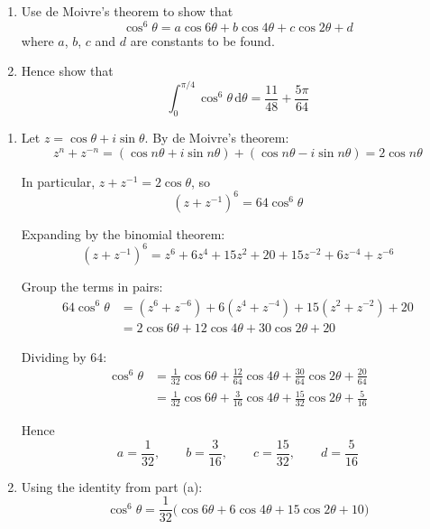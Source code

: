 \documentclass[leqno]{article}
\begin{document}
\begin{enumerate}[
  label=\textbf{\arabic*.},
  leftmargin=*,
  topsep=0pt,
  partopsep=0pt,
  parsep=0pt
]
\newpage

\questionitem

\begin{enumerate}[label=\textbf{(\alph*)}]
  \item Use de Moivre's theorem to show that
  \[
  \cos^6 \theta = a \cos 6\theta + b \cos 4\theta + c \cos 2\theta + d
  \]
  where $a$, $b$, $c$ and $d$ are constants to be found.  \\
  \item Hence show that
  \[
  \int_0^{\pi/4} \cos^6 \theta \, \mathrm{d}\theta = \frac{11}{48} + \frac{5\pi}{64}
  \]
\end{enumerate}

\vspace*{10pt}

\begin{djsSolution}
\begin{enumerate}[label=\textbf{(\alph*)}]
  \item Let \(z=\cos\theta+i\sin\theta\). By de Moivre's theorem:
  \[
  z^n+z^{-n}=(\cos n\theta+i\sin n\theta)+(\cos n\theta-i\sin n\theta)=2\cos n\theta
  \]

  In particular, \(z+z^{-1}=2\cos\theta\), so
  \[
  (z+z^{-1})^6=64\cos^6\theta
  \]

  Expanding by the binomial theorem:
  \[
  (z+z^{-1})^6=z^6+6z^4+15z^2+20+15z^{-2}+6z^{-4}+z^{-6}
  \]

  Group the terms in pairs:
  \begin{align*}
  64\cos^6\theta
  &=(z^6+z^{-6})+6(z^4+z^{-4})+15(z^2+z^{-2})+20 \\
  &=2\cos 6\theta+12\cos 4\theta+30\cos 2\theta+20
  \end{align*}

  Dividing by \(64\):
  \begin{align*}
  \cos^6\theta
  &=\frac{1}{32}\cos 6\theta+\frac{12}{64}\cos 4\theta+\frac{30}{64}\cos 2\theta+\frac{20}{64} \\
  &=\frac{1}{32}\cos 6\theta+\frac{3}{16}\cos 4\theta+\frac{15}{32}\cos 2\theta+\frac{5}{16}
  \end{align*}

  Hence
  \[
  a=\frac{1}{32},\qquad b=\frac{3}{16},\qquad c=\frac{15}{32},\qquad d=\frac{5}{16}
  \]

  \item Using the identity from part (a):
  \[
  \cos^6\theta=\frac{1}{32}\bigl(\cos 6\theta+6\cos 4\theta+15\cos 2\theta+10\bigr)
  \]


\end{enumerate}
\end{djsSolution}
\end{enumerate}
\end{document}
